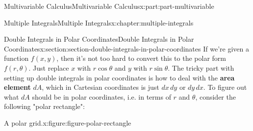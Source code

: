 \documentclass[twoside,10pt,]{tufte-book}
\newcommand{\terminology}[1]{\textbf{#1}}
\numberwithin{equation}{part}
\begin{document}
\begin{partptx}{Multivariable Calculus}{}{Multivariable Calculus}{}{}{x:part:part-multivariable}
\begin{chapterptx}{Multiple Integrals}{}{Multiple Integrals}{}{}{x:chapter:multiple-integrals}
\begin{sectionptx}{Double Integrals in Polar Coordinates}{}{Double Integrals in Polar Coordinates}{}{}{x:section:section-double-integrals-in-polar-coordinates}
If we're given a function \(f(x,y)\), then it's not too hard to convert this to the polar form \(f(r,\theta)\). Just replace \(x\) with \(r\cos\theta\) and \(y\) with \(r\sin\theta\). The tricky part with setting up double integrals in polar coordinates is how to deal with the \terminology{area element} \(dA\), which in Cartesian coordinates is just \(dx\,dy\) or \(dy\,dx\). To figure out what \(dA\) should be in polar coordinates, i.e. in terms of \(r\) and \(\theta\), consider the following "polar rectangle": \begin{figureptx}{A polar grid.}{x:figure:figure-polar-rectangle}{}%
\begin{image}{0}{1}{0}%
\end{image}
\end{figureptx}
\end{sectionptx}
\end{chapterptx}
\end{partptx}
\end{document}
